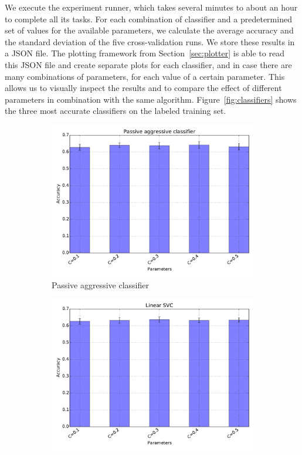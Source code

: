 \documentclass{article}
\begin{document}
We execute the experiment runner, which takes several minutes to about an hour 
to complete all its tasks. For each combination of classifier and 
a predetermined set of values for the available parameters, we calculate the 
average accuracy and the standard deviation of the five cross-validation runs. 
We store these results in a JSON file. The plotting framework from 
Section~\ref{sec:plotter} is able to read this JSON file and create separate 
plots for each classifier, and in case there are many combinations of 
parameters, for each value of a certain parameter. This allows us to visually 
inspect the results and to compare the effect of different parameters in 
combination with the same algorithm. Figure~\ref{fig:classifiers} shows the 
three most accurate classifiers on the labeled training set.

\begin{figure}[h!]
  \centering
  \begin{subfigure}{.48\textwidth}
    \centering
    \includegraphics[width=\textwidth]{Images/Passive_aggressive.pdf}
    \caption{Passive aggressive classifier}\label{fig:classifiers-passive-aggressive}
  \end{subfigure}
  \begin{subfigure}{.48\textwidth}
    \centering
    \includegraphics[width=\textwidth]{Images/Linear_SVC.pdf}

\end{subfigure}
\end{figure}
\end{document}
